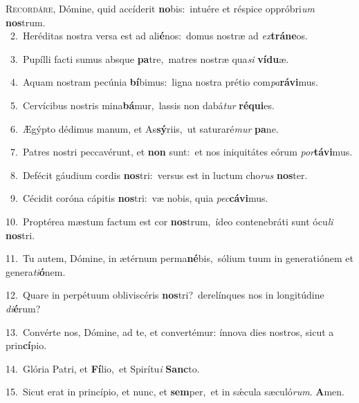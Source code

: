 \lettrine{\initial\textcolor{\initialcolor}{R}}{ecordáre,} Dómine, quid accíderit \textbf{no}\-bis:~\star intuére et réspice oppróbri\textit{um} \textbf{nos}\-trum.\\
{\numbfont\textcolor{\numbcolor}{~2.}}~Heréditas nostra versa est ad ali\-\textbf{é}\-nos:~\star domus nostræ ad \textit{ex}\-\textbf{trá}\textbf{ne}os.\par
{\numbfont\textcolor{\numbcolor}{~3.}}~Pupílli facti sumus absque \textbf{pa}\-tre,~\star matres nostræ qua\textit{si} \textbf{ví}\-\textbf{du}æ.\par
{\numbfont\textcolor{\numbcolor}{~4.}}~Aquam nostram pecúnia \textbf{bí}\-bimus:~\star ligna nostra prétio com\-\textit{pa}\-\textbf{rá}\textbf{vi}mus.\par
{\numbfont\textcolor{\numbcolor}{~5.}}~Cervícibus nostris mina\-\textbf{bá}\-mur,~\star lassis non dabá\textit{tur} \textbf{ré}\-\textbf{qui}es.\par
{\numbfont\textcolor{\numbcolor}{~6.}}~Ægýpto dédimus manum, et As\-\textbf{sý}\-riis,~\star ut saturaré\textit{mur} \textbf{pa}\-ne.\par
{\numbfont\textcolor{\numbcolor}{~7.}}~Patres nostri peccavérunt, et \textbf{non} sunt:~\star et nos iniquitátes eórum \textit{por}\-\textbf{tá}\textbf{vi}mus.\par
{\numbfont\textcolor{\numbcolor}{~8.}}~Defécit gáudium cordis \textbf{nos}\-tri:~\star versus est in luctum cho\textit{rus} \textbf{nos}\-ter.\par
{\numbfont\textcolor{\numbcolor}{~9.}}~Cécidit coróna cápitis \textbf{nos}\-tri:~\star væ nobis, quia \textit{pec}\-\textbf{cá}\textbf{vi}mus.\par
{\numbfont\textcolor{\numbcolor}{10.}}~Proptérea mæstum factum est cor \textbf{nos}\-trum,~\star ídeo contenebráti sunt ócu\textit{li} \textbf{nos}\-tri.\par
{\numbfont\textcolor{\numbcolor}{11.}}~Tu autem, Dómine, in ætérnum perma\-\textbf{né}\-bis,~\star sólium tuum in generatiónem et genera\-\textit{ti}\-\textbf{ó}nem.\par
{\numbfont\textcolor{\numbcolor}{12.}}~Quare in perpétuum obliviscéris \textbf{nos}\-tri?~\star derelínques nos in longitúdine \textit{di}\-\textbf{é}rum?\par
{\numbfont\textcolor{\numbcolor}{13.}}~Convérte nos, Dómine, ad te, et convertémur: ínnova dies nostros, sicut a prin\-\textbf{cí}\-pio.\par
{\numbfont\textcolor{\numbcolor}{14.}}~Glória Patri, et \textbf{Fí}\-lio,~\star et Spirítu\textit{i} \textbf{Sanc}\-to.\par
{\numbfont\textcolor{\numbcolor}{15.}}~Sicut erat in princípio, et nunc, et \textbf{sem}\-per,~\star et in sǽcula sæculó\-\textit{rum}\-. \textbf{A}\-men.\par
